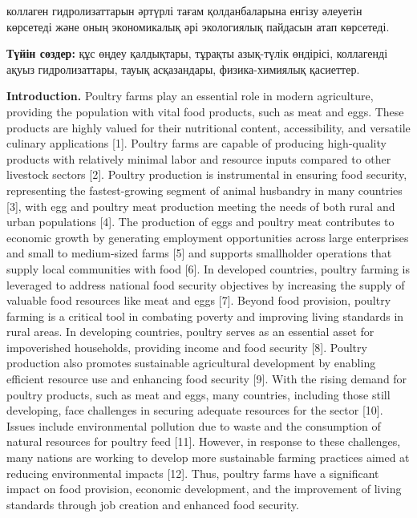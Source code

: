 коллаген гидролизаттарын әртүрлі тағам қолданбаларына енгізу әлеуетін
көрсетеді және оның экономикалық әрі экологиялық пайдасын атап
көрсетеді.

{\bfseries Түйін сөздер:} құс өңдеу қалдықтары, тұрақты азық-түлік
өндірісі, коллагенді ақуыз гидролизаттары, тауық асқазандары,
физика-химиялық қасиеттер.

\begin{multicols}{2}
{\bfseries Introduction.} Poultry farms play an essential role in modern
agriculture, providing the population with vital food products, such as
meat and eggs. These products are highly valued for their nutritional
content, accessibility, and versatile culinary applications {[}1{]}.
Poultry farms are capable of producing high-quality products with
relatively minimal labor and resource inputs compared to other livestock
sectors {[}2{]}. Poultry production is instrumental in ensuring food
security, representing the fastest-growing segment of animal husbandry
in many countries {[}3{]}, with egg and poultry meat production meeting
the needs of both rural and urban populations {[}4{]}. The production of
eggs and poultry meat contributes to economic growth by generating
employment opportunities across large enterprises and small to
medium-sized farms {[}5{]} and supports smallholder operations that
supply local communities with food {[}6{]}. In developed countries,
poultry farming is leveraged to address national food security
objectives by increasing the supply of valuable food resources like meat
and eggs {[}7{]}. Beyond food provision, poultry farming is a critical
tool in combating poverty and improving living standards in rural areas.
In developing countries, poultry serves as an essential asset for
impoverished households, providing income and food security {[}8{]}.
Poultry production also promotes sustainable agricultural development by
enabling efficient resource use and enhancing food security {[}9{]}.
With the rising demand for poultry products, such as meat and eggs, many
countries, including those still developing, face challenges in securing
adequate resources for the sector {[}10{]}. Issues include environmental
pollution due to waste and the consumption of natural resources for
poultry feed {[}11{]}. However, in response to these challenges, many
nations are working to develop more sustainable farming practices aimed
at reducing environmental impacts {[}12{]}. Thus, poultry farms have a
significant impact on food provision, economic development, and the
improvement of living standards through job creation and enhanced food
security.


\end{multicols}
